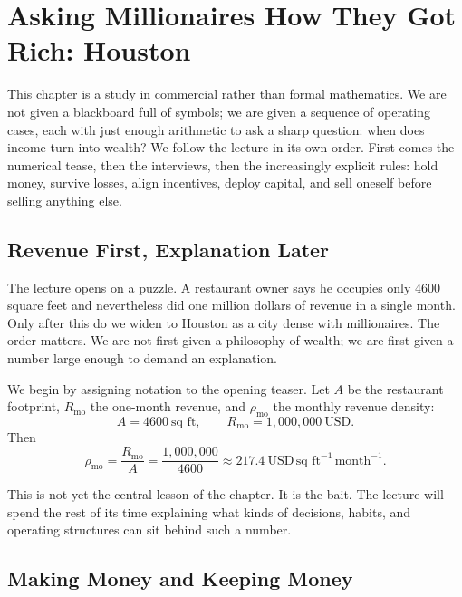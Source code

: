 \chapter{Asking Millionaires How They Got Rich: Houston}

This chapter is a study in commercial rather than formal mathematics. We are not given a blackboard full of symbols; we are given a sequence of operating cases, each with just enough arithmetic to ask a sharp question: when does income turn into wealth? We follow the lecture in its own order. First comes the numerical tease, then the interviews, then the increasingly explicit rules: hold money, survive losses, align incentives, deploy capital, and sell oneself before selling anything else.

\section{Revenue First, Explanation Later}

The lecture opens on a puzzle. A restaurant owner says he occupies only \(4600\) square feet and nevertheless did one million dollars of revenue in a single month. Only after this do we widen to Houston as a city dense with millionaires. The order matters. We are not first given a philosophy of wealth; we are first given a number large enough to demand an explanation.

We begin by assigning notation to the opening teaser. Let \(A\) be the restaurant footprint, \(R_{\mathrm{mo}}\) the one-month revenue, and \(\rho_{\mathrm{mo}}\) the monthly revenue density:
\begin{equation}
A=4600\ \text{sq ft},
\qquad
R_{\mathrm{mo}}=1{,}000{,}000\ \text{USD}.
\end{equation}
Then
\begin{equation}
\rho_{\mathrm{mo}}
=
\frac{R_{\mathrm{mo}}}{A}
=
\frac{1{,}000{,}000}{4600}
\approx
217.4\ \text{USD}\,\text{sq ft}^{-1}\,\text{month}^{-1}.
\end{equation}

This is not yet the central lesson of the chapter. It is the bait. The lecture will spend the rest of its time explaining what kinds of decisions, habits, and operating structures can sit behind such a number.

\section{Making Money and Keeping Money}

